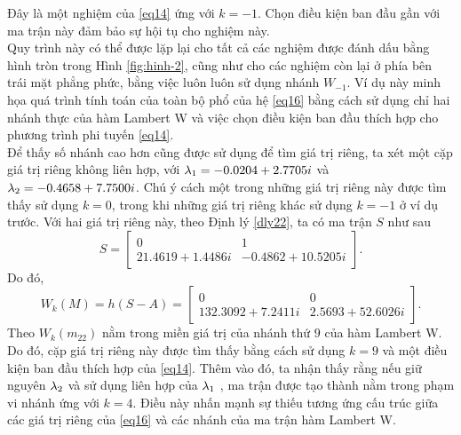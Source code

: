 Đây là một nghiệm của \eqref{eq14} ứng với $k = -1$. Chọn điều kiện ban đầu gần với ma trận này đảm bảo sự hội tụ cho nghiệm này.\\
Quy trình này có thể được lặp lại cho tất cả các nghiệm được đánh dấu bằng hình tròn trong Hình \ref{fig:hinh-2}, cũng như cho các nghiệm còn lại ở phía bên trái mặt phẳng phức, bằng việc luôn luôn sử dụng nhánh $W_{-1}$. Ví dụ này minh họa quá trình tính toán của toàn bộ phổ của hệ \eqref{eq16} bằng cách sử dụng chỉ hai nhánh thực của hàm Lambert W và việc chọn điều kiện ban đầu thích hợp cho phương trình phi tuyến \eqref{eq14}.\\
Để thấy số nhánh cao hơn cũng được sử dụng để tìm giá trị riêng, ta xét một cặp giá trị riêng không liên hợp, với $\lambda_1=-0.0204 + 2.7705i$ và $\lambda_2 = -0.4658 + 7.7500i$. Chú ý cách một trong những giá trị riêng này được tìm thấy sử dụng $k =0$, trong khi những giá trị riêng khác sử dụng $k = -1$ ở ví dụ trước. Với hai giá trị riêng này, theo Định lý \ref{dly22}, ta có ma trận $S$ như sau
\begin{equation*}
	S= \begin{bmatrix}
		0&1\\   21.4619 + 1.4486i & -0.4862 +10.5205i
	\end{bmatrix}.
\end{equation*}
Do đó,
\begin{equation} \label{eq42}
W_k(M)= h  (S-A) = \begin{bmatrix}
		0&0\\   132.3092 + 7.2411i &  2.5693 + 52.6026i	
	\end{bmatrix}.
\end{equation}
Theo \cite{Cor96} $W_k(m_{22})$ nằm trong miền giá trị của nhánh thứ $9$ của hàm Lambert W. Do đó, cặp giá trị riêng này được tìm thấy bằng cách sử dụng $k = 9$ và một điều kiện ban đầu thích hợp của \eqref{eq14}. Thêm vào đó, ta nhận thấy rằng nếu giữ nguyên $\lambda_2$ và sử dụng liên hợp của $\lambda_1$ , ma trận được tạo thành nằm trong phạm vi nhánh ứng với $k =4$. Điều này nhấn mạnh sự thiếu tương ứng cấu trúc giữa các giá trị riêng của \eqref{eq16} và các nhánh của ma trận hàm Lambert W.

